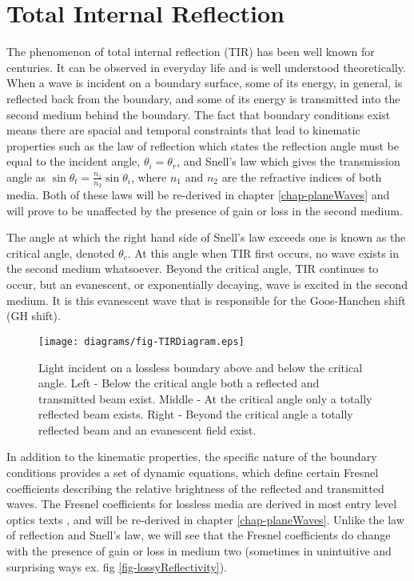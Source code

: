 \documentclass[12pt]{uthesis-v12}
\begin{document}
\section{Total Internal Reflection}\label{intro-TIR}

The phenomenon of total internal reflection (TIR) has been well known for centuries. It can be observed in everyday life and is well understood theoretically\cite{Hecht}. When a wave is incident on a boundary surface, some of its energy, in general, is reflected back from the boundary, and some of its energy is transmitted into the second medium behind the boundary. The fact that boundary conditions exist means there are spacial and temporal constraints that lead to kinematic properties such as the law of reflection which states the reflection angle must be equal to the incident angle, $\theta_i=\theta_r$, and Snell's law which gives the transmission angle as $\sin\theta_t = \frac{n_1}{n_2}\sin\theta_i$, where $n_1$ and $n_2$ are the refractive indices of both media. Both of these laws will be re-derived in chapter \ref{chap-planeWaves} and will prove to be unaffected by the presence of gain or loss in the second medium.

The angle at which the right hand side of Snell's law exceeds one is known as the critical angle, denoted $\theta_c$. At this angle when TIR first occurs, no wave exists in the second medium whatsoever.  Beyond the critical angle, TIR continues to occur, but an evanescent, or exponentially decaying, wave is excited in the second medium. It is this evanescent wave that is responsible for the Goos-Hanchen shift (GH shift)\cite{Fan}.

\begin{figure}[ht]
 \centering
 \texttt{[image: diagrams/fig-TIRDiagram.eps]}
 \caption[Light incident on a lossless boundary above and below the critical angle.]{Light incident on a lossless boundary above and below the critical angle. Left - Below the critical angle both a reflected and transmitted beam exist. Middle - At the critical angle only a totally reflected beam exists. Right - Beyond the critical angle a totally reflected beam and an evanescent field exist.
 \label{fig-TIRDiagram}}
\end{figure}

In addition to the kinematic properties, the specific nature of the boundary conditions provides a set of dynamic equations, which define certain Fresnel coefficients describing the relative brightness of the reflected and transmitted waves. The Fresnel coefficients for lossless media are derived in most entry level optics texts \cite{Hecht} \cite{Jackson}, and will be re-derived in chapter \ref{chap-planeWaves}. Unlike the law of reflection and Snell's law, we will see that the Fresnel coefficients do change with the presence of gain or loss in medium two (sometimes in unintuitive and surprising ways ex. fig \ref{fig-lossyReflectivity}).
\end{document}
